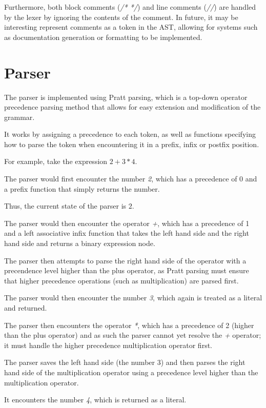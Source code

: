 Furthermore, both block comments (\textit{/* */}) and line comments (\textit{//}) are handled by the lexer by ignoring
the contents of the comment.
In future, it may be interesting represent comments as a token in the AST, allowing for systems such as documentation
generation or formatting to be implemented.

\section{Parser}\label{sec:parser}

The parser is implemented using Pratt parsing\citep{pratt1973top}, which is a top-down operator precedence parsing 
method that allows for easy extension and modification of the grammar.

It works by assigning a precedence to each token, as well as functions specifying how to parse the token when 
encountering it in a prefix, infix or postfix position.

For example, take the expression $2 + 3 * 4$.

The parser would first encounter the number \textit{2}, which has a precedence of 0 and a prefix function that
simply returns the number.

Thus, the current state of the parser is $2$.

The parser would then encounter the operator \textit{+}, which has a precedence of 1 and a left associative infix
function that takes the left hand side and the right hand side and returns a binary expression node.

The parser then attempts to parse the right hand side of the operator with a precendence level higher than the
plus operator, as Pratt parsing must ensure that higher precedence operations (such as multiplication) are parsed
first.

The parser would then encounter the number \textit{3}, which again is treated as a literal and returned.

The parser then encounters the operator \textit{*}, which has a precedence of 2 (higher than the plus operator) and 
as such the parser cannot yet resolve the \textit{+} operator; it must handle the higher precedence multiplication
operator first.

The parser saves the left hand side (the number 3) and then parses the right hand side of the multiplication 
operator using a precedence level higher than the multiplication operator.

It encounters the number \textit{4}, which is returned as a literal.

